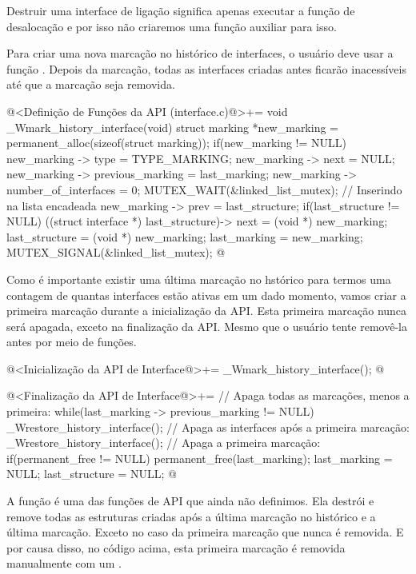 Destruir uma interface de ligação significa apenas executar a função
de desalocação e por isso não criaremos uma função auxiliar para isso.



Para criar uma nova marcação no histórico de interfaces, o usuário
deve usar a função . Depois da
marcação, todas as interfaces criadas antes ficarão inacessíveis até
que a marcação seja removida.

\iniciocodigo
@<Definição de Funções da API (interface.c)@>+=
void _Wmark_history_interface(void){
  struct marking *new_marking = permanent_alloc(sizeof(struct marking));
  if(new_marking != NULL){
    new_marking -> type = TYPE_MARKING;
    new_marking -> next = NULL;
    new_marking -> previous_marking = last_marking;
    new_marking -> number_of_interfaces = 0;
    MUTEX_WAIT(&linked_list_mutex); // Inserindo na lista encadeada
    new_marking -> prev = last_structure;
    if(last_structure != NULL)
      ((struct interface *) last_structure)-> next = (void *) new_marking;
    last_structure = (void *) new_marking;
    last_marking = new_marking;
    MUTEX_SIGNAL(&linked_list_mutex);
  }
}
@
\fimcodigo

Como é importante existir uma última marcação no hstórico para termos
uma contagem de quantas interfaces estão ativas em um dado momento,
vamos criar a primeira marcação durante a inicialização da API. Esta
primeira marcação nunca será apagada, exceto na finalização da
API. Mesmo que o usuário tente removê-la antes por meio de funções.

\iniciocodigo
@<Inicialização da API de Interface@>+=
_Wmark_history_interface();
@
\fimcodigo

\iniciocodigo
@<Finalização da API de Interface@>+=
// Apaga todas as marcações, menos a primeira:
while(last_marking -> previous_marking != NULL){
  _Wrestore_history_interface();
}
// Apaga as interfaces após a primeira marcação:
_Wrestore_history_interface();
// Apaga a primeira marcação:
if(permanent_free != NULL)
  permanent_free(last_marking);
last_marking = NULL;
last_structure = NULL;
@
\fimcodigo

A função  é uma das funções
de API que ainda não definimos. Ela destrói e remove todas as
estruturas criadas após a última marcação no histórico e a última
marcação. Exceto no caso da primeira marcação que nunca é removida. E
por causa disso, no código acima, esta primeira marcação é removida
manualmente com um .

